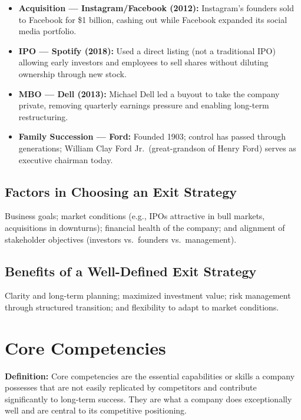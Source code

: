 \documentclass[11pt, letterpaper]{article}
\begin{document}
\begin{itemize}[leftmargin=*]
  \item \textbf{Acquisition --- Instagram/Facebook (2012):} Instagram's founders sold to Facebook for \$1 billion, cashing out while Facebook expanded its social media portfolio.
  \item \textbf{IPO --- Spotify (2018):} Used a direct listing (not a traditional IPO) allowing early investors and employees to sell shares without diluting ownership through new stock.
  \item \textbf{MBO --- Dell (2013):} Michael Dell led a buyout to take the company private, removing quarterly earnings pressure and enabling long-term restructuring.
  \item \textbf{Family Succession --- Ford:} Founded 1903; control has passed through generations; William Clay Ford Jr.\ (great-grandson of Henry Ford) serves as executive chairman today.
\end{itemize}

\subsection{Factors in Choosing an Exit Strategy}

Business goals; market conditions (e.g., IPOs attractive in bull markets, acquisitions in downturns); financial health of the company; and alignment of stakeholder objectives (investors vs.\ founders vs.\ management).

\subsection{Benefits of a Well-Defined Exit Strategy}

Clarity and long-term planning; maximized investment value; risk management through structured transition; and flexibility to adapt to market conditions.

\newpage

\section{Core Competencies}

\begin{defbox}
\textbf{Definition:} Core competencies are the essential capabilities or skills a company possesses that are not easily replicated by competitors and contribute significantly to long-term success. They are what a company does exceptionally well and are central to its competitive positioning.
\end{defbox}
\end{document}
